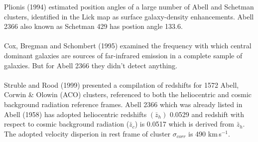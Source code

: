 Plionis (1994) estimated position angles of a large number of Abell and Schetman clusters, identified in the Lick map as surface galaxy-density enhancements. Abell 2366 also known as Schetman 429 has postion angle 133.6.\\\\
Cox, Bregman and Schombert (1995) examined the frequency with which central dominant galaxies are sources of far-infrared emission in a complete sample of galaxies. But for Abell 2366 they didn't detect anything.\\\\
Struble and Rood (1999) presented a compilation of redshifts for 1572 Abell, Corwin \& Olowin (ACO) clusters, referenced to both the heliocentric and cosmic background radiation reference frames. Abell 2366 which was already listed in Abell (1958) has adopted heliocentric redshifts $(\bar{z}_h)$ 0.0529 and redshift with respect to cosmic background radiation ($\bar{z}_c$) is 0.0517 which is derived from $\bar{z}_h$. The adopted velocity disperion in rest frame of cluster $\sigma_{corr}$ is 490 km\,s$^{-1}$.